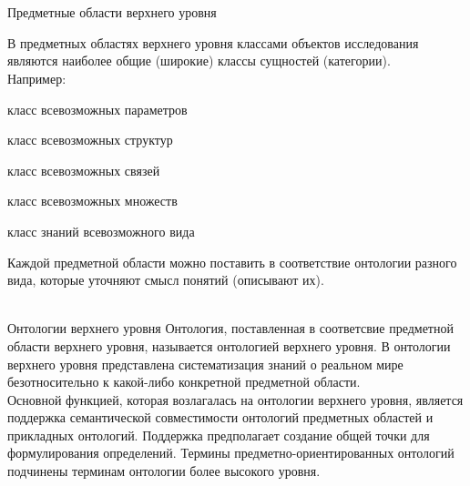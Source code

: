 \begin{frame}{\\}
	\topline
	\justifying
	\begin{SCn}
	\end{SCn}
\end{frame}


\begin{frame}{\\Предметные области верхнего уровня}
	\topline
	\justifying
	
	В предметных областях верхнего уровня классами объектов исследования являются наиболее общие (широкие) классы сущностей (категории). \\
	Например:
	\begin{textitemize}
		\item класс всевозможных параметров
		\item класс всевозможных структур
		\item класс всевозможных связей
		\item класс всевозможных множеств
		\item класс знаний всевозможного вида
	\end{textitemize}

	Каждой предметной области можно поставить в соответствие онтологии разного вида, которые уточняют смысл понятий (описывают их).
\end{frame}

\begin{frame}{\\Онтологии верхнего уровня}
	\topline
	\justifying
	 Онтология, поставленная в соответсвие предметной области верхнего уровня, называется онтологией верхнего уровня. В онтологии верхнего уровня представлена систематизация знаний о реальном мире безотносительно к какой-либо конкретной предметной области. \\\vspace{3mm}
	 Основной функцией, которая возлагалась на онтологии верхнего уровня, является поддержка семантической совместимости онтологий предметных областей и прикладных онтологий. Поддержка предполагает создание общей точки для формулирования определений. Термины предметно-ориентированных онтологий подчинены терминам онтологии более высокого уровня. \\

\end{frame}